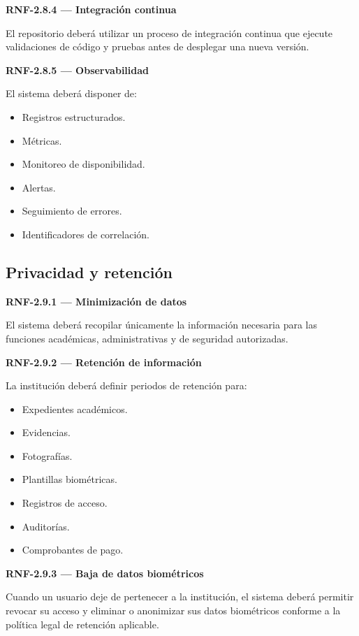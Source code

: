 \documentclass[12pt,a4paper]{article}
\newcommand{\RNF}[1]{\textbf{\color{secondary}RNF-#1}}
\newenvironment{requisito}[1]
{
\begin{center}
\begin{minipage}{0.96\textwidth}
\colorbox{requirement}{
\begin{minipage}{0.94\textwidth}
\textbf{#1}
\end{minipage}
}
\vspace{2mm}
}
{
\end{minipage}
\end{center}
}
\begin{document}
\begin{requisito}{\RNF{2.8.4} --- Integración continua}
El repositorio deberá utilizar un proceso de integración continua que ejecute
validaciones de código y pruebas antes de desplegar una nueva versión.
\end{requisito}

\begin{requisito}{\RNF{2.8.5} --- Observabilidad}
El sistema deberá disponer de:

\begin{itemize}[leftmargin=*]
\item Registros estructurados.
\item Métricas.
\item Monitoreo de disponibilidad.
\item Alertas.
\item Seguimiento de errores.
\item Identificadores de correlación.
\end{itemize}
\end{requisito}

\subsection{Privacidad y retención}

\begin{requisito}{\RNF{2.9.1} --- Minimización de datos}
El sistema deberá recopilar únicamente la información necesaria para las
funciones académicas, administrativas y de seguridad autorizadas.
\end{requisito}

\begin{requisito}{\RNF{2.9.2} --- Retención de información}
La institución deberá definir periodos de retención para:

\begin{itemize}[leftmargin=*]
\item Expedientes académicos.
\item Evidencias.
\item Fotografías.
\item Plantillas biométricas.
\item Registros de acceso.
\item Auditorías.
\item Comprobantes de pago.
\end{itemize}
\end{requisito}

\begin{requisito}{\RNF{2.9.3} --- Baja de datos biométricos}
Cuando un usuario deje de pertenecer a la institución, el sistema deberá permitir
revocar su acceso y eliminar o anonimizar sus datos biométricos conforme a la
política legal de retención aplicable.
\end{requisito}
\end{document}
